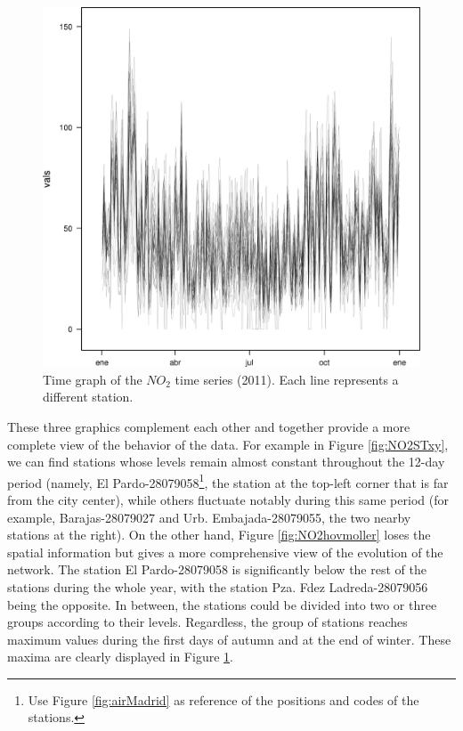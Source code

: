 \documentclass[smallroyalvopaper]{memoir}
\begin{document}
\begin{figure}[htb]
\centering
\includegraphics[width=.9\linewidth]{figs/NO2zoo.png}
\caption{\label{fig:NO2zoo}Time graph of the $NO_2$ time series (2011). Each line represents a different station.}
\end{figure}

These three graphics complement each other and together provide a more
complete view of the behavior of the data. For example in Figure
\ref{fig:NO2STxy}, we can find stations whose levels remain almost constant
throughout the 12-day period (namely, El Pardo-28079058\footnote{Use Figure \ref{fig:airMadrid} as reference of the
positions and codes of the stations.}, the
station at the top-left corner that is far from the city center),
while others fluctuate notably during this same period (for example,
Barajas-28079027 and Urb. Embajada-28079055, the two nearby stations
at the right). On the other hand, Figure \ref{fig:NO2hovmoller} loses the
spatial information but gives a more comprehensive view of the
evolution of the network. The station El Pardo-28079058 is
significantly below the rest of the stations during the whole year,
with the station Pza. Fdez Ladreda-28079056 being the opposite. In
between, the stations could be divided into two or three groups
according to their levels. Regardless, the group of stations reaches
maximum values during the first days of autumn and at the end of
winter. These maxima are clearly displayed in Figure \ref{fig:NO2zoo}.
\end{document}
